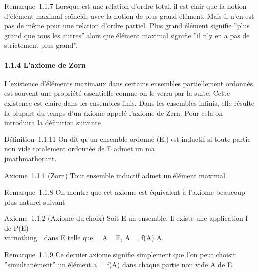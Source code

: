 Remarque~1.1.7 Lorsque \leqslant est une relation d'ordre total, il est clair
que la notion d'élément maximal coïncide avec la notion de plus grand
élément. Mais il n'en est pas de même pour une relation d'ordre partiel.
Plus grand élément signifie ''plus grand que tous les autres'' alors que
élément maximal signifie ''il n'y en a pas de strictement plus grand''.

\paragraph{1.1.4 L'axiome de Zorn}

L'existence d'éléments maximaux dans certains ensembles partiellement
ordonnés est souvent une propriété essentielle comme on le verra par la
suite. Cette existence est claire dans les ensembles finis. Dans les
ensembles infinis, elle résulte la plupart du temps d'un axiome appelé
l'axiome de Zorn. Pour cela on introduira la définition suivante

Définition~1.1.11 On dit qu'un ensemble ordonné (E,\leqslant) est inductif si
toute partie non vide totalement ordonnée de E admet un ma\\jmathmathorant.

Axiome~1.1.1 (Zorn) Tout ensemble inductif admet un élément maximal.

Remarque~1.1.8 On montre que cet axiome est équivalent à l'axiome
beaucoup plus naturel suivant

Axiome~1.1.2 (Axiome du choix) Soit E un ensemble. Il existe une
application f de P(E) \diagdown\\varnothing~\ dans E
telle que \forall~~A \subset~ E,
A\neq~\varnothing~, f(A) \in A.

Remarque~1.1.9 Ce dernier axiome signifie simplement que l'on peut
choisir ''simultanément'' un élément a = f(A) dans chaque partie non
vide A de E.


